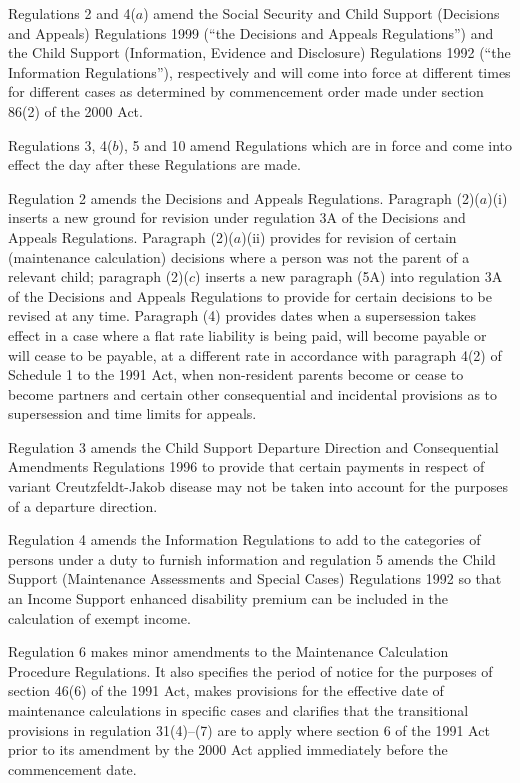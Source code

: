 \documentclass[12pt,a4paper]{article}
\begin{document}
Regulations 2 and 4($a$)  amend the Social Security and Child Support (Decisions and Appeals) Regulations 1999 (“the Decisions and Appeals Regulations”) and the Child Support (Information, Evidence and Disclosure) Regulations 1992 (“the Information Regulations”), respectively and will come into force at different times for different cases as determined by commencement order made under section 86(2) of the 2000 Act.

Regulations 3, 4($b$), 5 and 10 amend Regulations which are in force and come into effect the day after these Regulations are made.

Regulation 2 amends the Decisions and Appeals Regulations. Paragraph (2)($a$)(i)  inserts a new ground for revision under regulation 3A of the Decisions and Appeals Regulations. Paragraph (2)($a$)(ii)  provides for revision of certain (maintenance calculation) decisions where a person was not the parent of a relevant child; paragraph (2)($c$)  inserts a new paragraph (5A) into regulation 3A of the Decisions and Appeals Regulations to provide for certain decisions to be revised at any time. Paragraph (4) provides dates when a supersession takes effect in a case where a flat rate liability is being paid, will become payable or will cease to be payable, at a different rate in accordance with paragraph 4(2) of Schedule 1 to the 1991 Act, when non-resident parents become or cease to become partners and certain other consequential and incidental provisions as to supersession and time limits for appeals.

Regulation 3 amends the Child Support Departure Direction and Consequential Amendments Regulations 1996 to provide that certain payments in respect of variant Creutzfeldt-Jakob disease may not be taken into account for the purposes of a departure direction.

Regulation 4 amends the Information Regulations to add to the categories of persons under a duty to furnish information and regulation 5 amends the Child Support (Maintenance Assessments and Special Cases) Regulations 1992 so that an Income Support enhanced disability premium can be included in the calculation of exempt income.

Regulation 6 makes minor amendments to the Maintenance Calculation Procedure Regulations. It also specifies the period of notice for the purposes of section 46(6) of the 1991 Act, makes provisions for the effective date of maintenance calculations in specific cases and clarifies that the transitional provisions in regulation 31(4)–(7) are to apply where section 6 of the 1991 Act prior to its amendment by the 2000 Act applied immediately before the commencement date.
\end{document}
